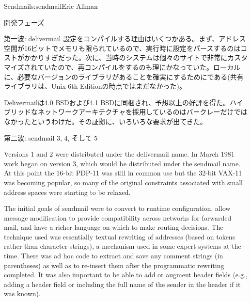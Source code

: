 \begin{aosachapter}{Sendmail}{s:sendmail}{Eric Allman}
\begin{aosasect1}{開発フェーズ}
\begin{aosasect2}{第一波: delivermail}
設定をコンパイルする理由はいくつかある。まず、アドレス空間が16ビットでメモリも限られているので、実行時に設定をパースするのはコストがかかりすぎだった。次に、当時のシステムは個々のサイトで非常にカスタマイズされていたので、再コンパイルをするのも理にかなっていた。ローカルに、必要なバージョンのライブラリがあることを確実にするためにである(共有ライブラリは、Unix 6th Editionの時点ではまだなかった)。

Delivermailは4.0 BSDおよび4.1 BSDに同梱され、予想以上の好評を得た。ハイブリッドなネットワークアーキテクチャを採用しているのはバークレーだけではなかったというわけだ。その証拠に、いろいろな要求が出てきた。

\end{aosasect2}

\begin{aosasect2}{第二波: sendmail 3, 4, そして 5}

Versions 1 and 2 were distributed under the delivermail name. In March
1981 work began on version 3, which would be distributed under the
sendmail name. At this point the 16-bit PDP-11 was still in common use
but the 32-bit VAX-11 was becoming popular, so many of the original
constraints associated with small address spaces were starting to be
relaxed.

The initial goals of sendmail were to convert to runtime
configuration, allow message modification to provide compatibility
across networks for forwarded mail, and have a richer language on
which to make routing decisions. The technique used was essentially
textual rewriting of addresses (based on tokens rather than
character strings),
a mechanism used in some expert systems at the time. There was ad hoc
code to extract and save any comment strings (in parentheses) as well
as to re-insert them after the programmatic rewriting completed. It
was also important to be able to add or augment header fields (e.g.,
adding a  header field or including the full name of the
sender in the  header if it was known).


\end{aosasect2}
\end{aosasect1}
\end{aosachapter}
